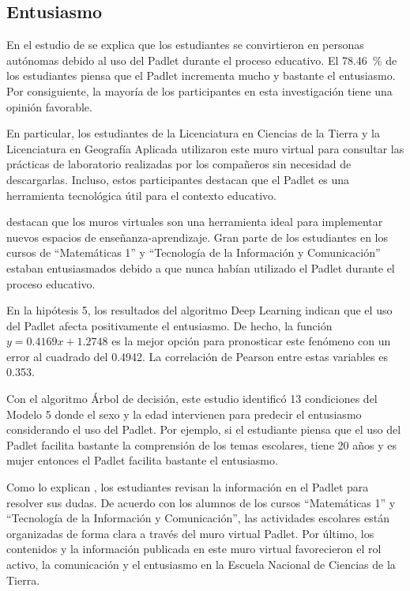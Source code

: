 \documentclass[spanish]{textolivre}
\begin{document}
\subsection{Entusiasmo}

En el estudio de \textcite{almwzaiji2022} se explica que los estudiantes se convirtieron en personas autónomas debido al uso del Padlet durante el proceso educativo. El 78.46~\% de los estudiantes piensa que el Padlet incrementa mucho y bastante el entusiasmo. Por consiguiente, la mayoría de los participantes en esta investigación tiene una opinión favorable.

En particular, los estudiantes de la Licenciatura en Ciencias de la Tierra y la Licenciatura en Geografía Aplicada utilizaron este muro virtual para consultar las prácticas de laboratorio realizadas por los compañeros sin necesidad de descargarlas. Incluso, estos participantes destacan que el Padlet es una herramienta tecnológica útil para el contexto educativo.

\textcite{bergaoui2023} destacan que los muros virtuales son una herramienta ideal para implementar nuevos espacios de enseñanza-aprendizaje. Gran parte de los estudiantes en los cursos de “Matemáticas 1” y “Tecnología de la Información y Comunicación” estaban entusiasmados debido a que nunca habían utilizado el Padlet durante el proceso educativo.

En la hipótesis 5, los resultados del algoritmo Deep Learning indican que el uso del Padlet afecta positivamente el entusiasmo. De hecho, la función $y = 0.4169x + 1.2748$ es la mejor opción para pronosticar este fenómeno con un error al cuadrado del 0.4942. La correlación de Pearson entre estas variables es 0.353.

Con el algoritmo Árbol de decisión, este estudio identificó 13 condiciones del Modelo 5 donde el sexo y la edad intervienen para predecir el entusiasmo considerando el uso del Padlet. Por ejemplo, si el estudiante piensa que el uso del Padlet facilita bastante la comprensión de los temas escolares, tiene 20 años y es mujer entonces el Padlet facilita bastante el entusiasmo.

Como lo explican \textcite{siantuba2023}, los estudiantes revisan la información en el Padlet para resolver sus dudas. De acuerdo con los alumnos de los cursos “Matemáticas 1” y “Tecnología de la Información y Comunicación”, las actividades escolares están organizadas de forma clara a través del muro virtual Padlet. Por último, los contenidos y la información publicada en este muro virtual favorecieron el rol activo, la comunicación y el entusiasmo en la Escuela Nacional de Ciencias de la Tierra.
\end{document}

